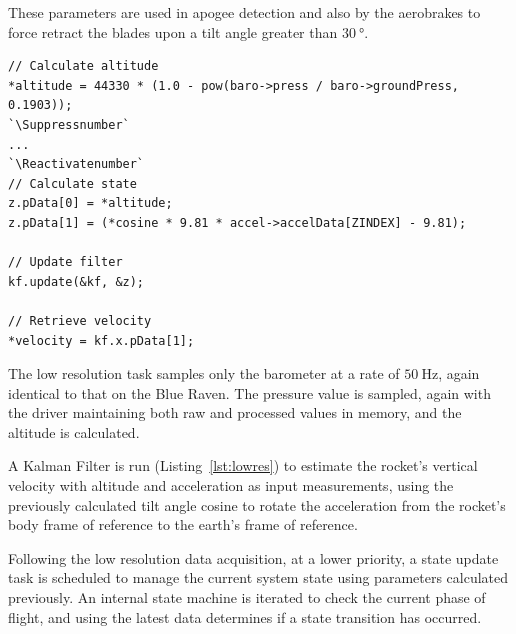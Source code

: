 These parameters are used in apogee detection and also by the aerobrakes to force retract the blades upon a tilt angle greater than $\qty{30}{\degree}$.\\

\begin{lstlisting}[escapeinside=``, caption={Low resolution state calculations}, captionpos=b, label={lst:lowres}]
// Calculate altitude
*altitude = 44330 * (1.0 - pow(baro->press / baro->groundPress, 0.1903));
`\Suppressnumber`
...
`\Reactivatenumber`
// Calculate state
z.pData[0] = *altitude;
z.pData[1] = (*cosine * 9.81 * accel->accelData[ZINDEX] - 9.81);

// Update filter
kf.update(&kf, &z);

// Retrieve velocity
*velocity = kf.x.pData[1];
\end{lstlisting}

The low resolution task samples only the barometer at a rate of $\qty{50}{\hertz}$, again identical to that on the Blue Raven. The pressure value is sampled, again with the driver maintaining both raw and processed values in memory, and the altitude is calculated. 

A Kalman Filter is run (Listing~\ref{lst:lowres}) to estimate the rocket's vertical velocity with altitude and acceleration as input measurements, using the previously calculated tilt angle cosine to rotate the acceleration from the rocket's body frame of reference to the earth's frame of reference.

Following the low resolution data acquisition, at a lower priority, a state update task is scheduled to manage the current system state using parameters calculated previously. An internal state machine is iterated to check the current phase of flight, and using the latest data determines if a state transition has occurred. 

